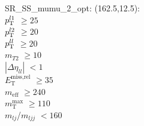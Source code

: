 SR\_SS\_mumu\_2\_opt: (162.5,12.5): \\
$p_{\text{T}}^{l1}$ $\geq 25$ \\
$p_{\text{T}}^{l2}$ $\geq 20$ \\
$p_{\text{T}}^{ll}$ $\geq 20$ \\
$m_{T2}$ $\geq 10$ \\
$|\Delta\eta_{ll}|$ $<1$ \\
$E_{\text{T}}^{\text{miss,rel}}$ $\geq 35$ \\
$m_{\text{eff}}$ $\geq 240$ \\
$m_{\text{T}}^{\text{max}}$ $\geq 110$ \\
$m_{lj}$/$m_{ljj}$ $<160$ \\
